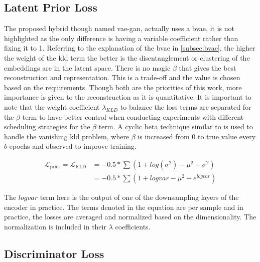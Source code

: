 \subsection{Latent Prior Loss}

The proposed hybrid though named \ac{vae}-\ac{gan}, actually uses a \ac{bvae}, it is not highlighted as the only difference is having a variable coefficient rather than fixing it to 1. Referring to the explanation of the \ac{bvae} in \ref{subsec:bvae}, the higher the weight of the \ac{kld} term the better is the disentanglement or clustering of the embeddings are in the latent space. There is no magic $\beta$ that gives the best reconstruction and representation. This is a trade-off and the value is chosen based on the requirements. Though both are the priorities of this work, more importance is given to the reconstruction as it is quantitative. It is important to note that the weight coefficient $\lambda_{KLD}$ to balance the loss terms are separated for the $\beta$ term to have better control when conducting experiments with different scheduling strategies for the $\beta$ term. A cyclic beta technique similar to \cite{cyclicbeta} is used to handle the vanishing \ac{kld} problem, where $\beta$ is increased from 0 to true value every $b$ epochs and observed to improve training.

\begin{equation} \label{eqn:loss_kld}
    \begin{split}
        \mathcal{L}_{\text {prior}} = \mathcal{L}_{\text {KLD}} &= -0.5 * \sum (1 + log(\sigma^2) - \mu^2 - \sigma^2) \\
        &= -0.5 * \sum (1 + logvar - \mu^2 - e^{logvar})
    \end{split}
\end{equation}

The $logvar$ term here is the output of one of the downsampling layers of the encoder in practice. The terms denoted in the equation are per sample and in practice, the losses are averaged and normalized based on the dimensionality. The normalization is included in their $\lambda$ coefficients.

\subsection{Discriminator Loss}

